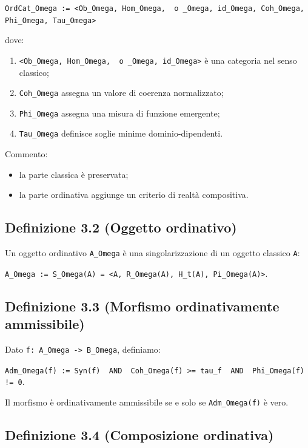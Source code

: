 \texttt{OrdCat\_Omega\ :=\ \textless{}Ob\_Omega,\ Hom\_Omega,\ \ o\ \_Omega,\ id\_Omega,\ Coh\_Omega,\ Phi\_Omega,\ Tau\_Omega\textgreater{}}

dove:

\begin{enumerate}
\def\labelenumi{\arabic{enumi}.}
\tightlist
\item
  \texttt{\textless{}Ob\_Omega,\ Hom\_Omega,\ \ o\ \_Omega,\ id\_Omega\textgreater{}} è una categoria nel senso classico;
\item
  \texttt{Coh\_Omega} assegna un valore di coerenza normalizzato;
\item
  \texttt{Phi\_Omega} assegna una misura di funzione emergente;
\item
  \texttt{Tau\_Omega} definisce soglie minime dominio-dipendenti.
\end{enumerate}

Commento:

\begin{itemize}
\tightlist
\item
  la parte classica è preservata;
\item
  la parte ordinativa aggiunge un criterio di realtà compositiva.
\end{itemize}

\subsection{Definizione 3.2 (Oggetto ordinativo)}

Un oggetto ordinativo \texttt{A\_Omega} è una singolarizzazione di un oggetto classico \texttt{A}:

\texttt{A\_Omega\ :=\ S\_Omega(A)\ =\ \textless{}A,\ R\_Omega(A),\ H\_t(A),\ Pi\_Omega(A)\textgreater{}}.

\subsection{Definizione 3.3 (Morfismo ordinativamente ammissibile)}

Dato \texttt{f:\ A\_Omega\ -\textgreater{}\ B\_Omega}, definiamo:

\texttt{Adm\_Omega(f)\ :=\ Syn(f)\ \ AND\ \ Coh\_Omega(f)\ \textgreater{}=\ tau\_f\ \ AND\ \ Phi\_Omega(f)\ !=\ 0}.

Il morfismo è ordinativamente ammissibile se e solo se \texttt{Adm\_Omega(f)} è vero.

\subsection{Definizione 3.4 (Composizione ordinativa)}


